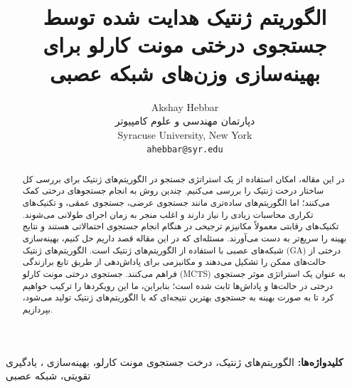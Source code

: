 \documentclass[11pt]{article}
\title{الگوریتم ژنتیک هدایت شده توسط جستجوی درختی مونت کارلو برای بهینه‌سازی وزن‌های شبکه عصبی}
\author{Akshay Hebbar\\
	دپارتمان مهندسی و علوم کامپیوتر\\
	Syracuse University, New York\\
	\texttt{ahebbar@syr.edu}}
\date{}
\begin{document}
	\maketitle
	
	\begin{abstract}
		در اين مقاله، امکان استفاده از یک استراتژی جستجو در الگوریتم‌های ژنتیک برای بررسی کل ساختار درخت ژنتیک را بررسی می‌کنیم. چندین روش به انجام جستجوهای درختی کمک می‌کنند؛ اما الگوریتم‌های ساده‌تری مانند جستجوی عرضی، جستجوی عمقی، و تکنیک‌های تکراری محاسبات زیادی را نیاز دارند و اغلب منجر به زمان اجرای طولانی می‌شوند. تکنیک‌های رقابتی معمولاً مکانیزم ترجیحی در هنگام انجام جستجوی احتمالاتی هستند و نتایج بهینه را سریع‌تر به دست می‌آورند. مسئله‌ای که در این مقاله قصد داریم حل کنیم، بهینه‌سازی شبکه‌های عصبی با استفاده از الگوریتم‌های ژنتیک است. الگوریتم‌های ژنتیک (GA) درختی از حالت‌های ممکن را تشکیل می‌دهند و مکانیزمی برای پاداش‌دهی از طریق تابع برازندگی فراهم می‌کنند. جستجوی درختی مونت کارلو (MCTS) به عنوان یک استراتژی موثر جستجوی درختی در حالت‌ها و پاداش‌ها ثابت شده است؛ بنابراین، ما این رویکردها را ترکیب خواهیم کرد تا به صورت بهینه به جستجوی بهترین نتیجه‌ای که با الگوریتم‌های ژنتیک تولید می‌شود، بپردازیم.
	\end{abstract}
	
	\noindent\textbf{کلیدواژه‌ها:} الگوریتم‌های ژنتیک، درخت جستجوی مونت کارلو، بهینه‌سازی ، یادگیری تقویتی، شبکه عصبی
	
\end{document}
